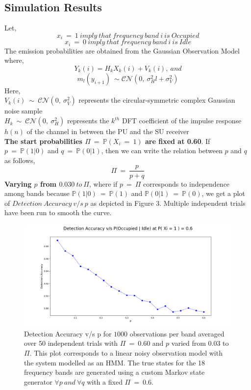 \documentclass[12pt, draftcls, onecolumn]{IEEEtran}
\begin{document}
\subsection{Simulation Results}
Let,
\[x_i\ =\ 1\ imply\ that\ frequency\ band\ i\ is\ Occupied\]
\[x_i\ =\ 0\ imply\ that\ frequency\ band\ i\ is\ Idle\]
The emission probabilities are obtained from the Gaussian Observation Model where,
\[Y_k(i) = H_kX_k(i) + V_k(i),\ and\]
\[m_l(y_{i+1})\ \sim \mathcal{CN}(0,\ \sigma_H^2l+\sigma_V^2)\]
Here,
\\$V_k(i)\ \sim\ \mathcal{CN}(0,\ \sigma_V^2)$ represents the circular-symmetric complex Gaussian noise sample
\\$H_k\ \sim\ \mathcal{CN}(0,\ \sigma_H^2)$ represents the $k^{th}$ DFT coefficient of the impulse response $h(n)$ of the channel in between the PU and the SU receiver
\\\textbf{The start probabilities $\Pi\ =\ \mathbb P(X_i\ =\ 1)$ are fixed at 0.60}.
If $p\ =\ \mathbb P(1|0)$ and $q\ =\ \mathbb P(0|1)$, then we can write the relation between $p$ and $q$ as follows,
\[\Pi\ =\ \frac{p}{p+q}\]
\textbf{Varying $p$ from $0.030\ to\ \Pi$}, where if $p\ =\ \Pi$ corresponds to independence among bands because $\mathbb P(1|0)\ =\ \mathbb P(1)$ and $\mathbb P(0|1)\ =\ \mathbb P(0)$, we get a plot of $Detection\ Accuracy\ v/s\ p$ as depicted in Figure 3. Multiple independent trials have been run to smooth the curve.
\begin{figure}[t]
\includegraphics[width=1.0\textwidth]{DetectionAccuracy_v_p_test_3_final.png}
\caption{Detection Accuracy v/s p for $1000$ observations per band averaged over 50 independent trials with $\Pi\ =\ 0.60$ and $p$ varied from $0.03$ to $\Pi$. This plot corresponds to a linear noisy observation model with the system modelled as an HMM. The true states for the 18 frequency bands are generated using a custom Markov state generator $\forall p\ and\ \forall q$ with a fixed $\Pi\ =\ 0.6$.}
\label{fig:mesh3}
\centering
\end{figure}
\clearpage
\end{document}
